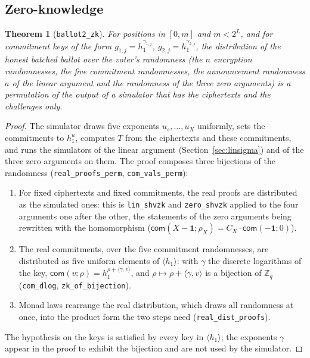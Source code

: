 \documentclass[11pt,a4paper]{article}
\newcommand{\Z}{\mathbb{Z}}
\newcommand{\com}{\mathsf{com}}
\newcommand{\rocq}[1]{\texttt{#1}}
\newtheorem{theorem}{Theorem}[section]
\theoremstyle{remark}
\begin{document}
\subsection{Zero-knowledge}
\begin{theorem}[\rocq{ballot2\_zk}]
For positions in $[0, m]$ and $m < 2^L$, and for commitment keys of the
form $g_{1,j} = h_1^{\gamma_{1,j}}$, $g_{2,j} = h_1^{\gamma_{2,j}}$, the
distribution of the honest batched ballot over the voter's randomness (the
$n$ encryption randomnesses, the five commitment randomnesses, the
announcement randomness $a$ of the linear argument and the randomness of
the three zero arguments) is a permutation of the output of a simulator
that has the ciphertexts and the challenges only.
\end{theorem}
\begin{proof}
The simulator draws five exponents $u_s, \ldots, u_X$ uniformly, sets the
commitments to $h_1^{u}$, computes $T$ from the ciphertexts and these
commitments, and runs the simulators of the linear argument
(Section~\ref{sec:linsigma}) and of the three zero arguments on them. The
proof composes three bijections of the randomness
(\rocq{real\_proofs\_perm}, \rocq{com\_vals\_perm}):
\begin{enumerate}[nosep]
  \item For fixed ciphertexts and fixed commitments, the real proofs are
  distributed as the simulated ones: this is \rocq{lin\_shvzk} and
  \rocq{zero\_shvzk} applied to the four arguments one after the other,
  the statements of the zero arguments being rewritten with the
  homomorphism ($\com(X - \mathbf{1}; \rho_X) = C_X \cdot \com(-\mathbf{1};
  0)$).
  \item The real commitments, over the five commitment randomnesses, are
  distributed as five uniform elements of $\langle h_1 \rangle$: with
  $\gamma$ the discrete logarithms of the key, $\com(v; \rho) = h_1^{\rho +
  \langle \gamma, v \rangle}$, and $\rho \mapsto \rho + \langle \gamma, v
  \rangle$ is a bijection of $\Z_q$ (\rocq{com\_dlog},
  \rocq{zk\_of\_bijection}).
  \item Monad laws rearrange the real distribution, which draws all
  randomness at once, into the product form the two steps need
  (\rocq{real\_dist\_proofs}).
\end{enumerate}
The hypothesis on the keys is satisfied by every key in $\langle h_1
\rangle$; the exponents $\gamma$ appear in the proof to exhibit the
bijection and are not used by the simulator.
\end{proof}
\end{document}

